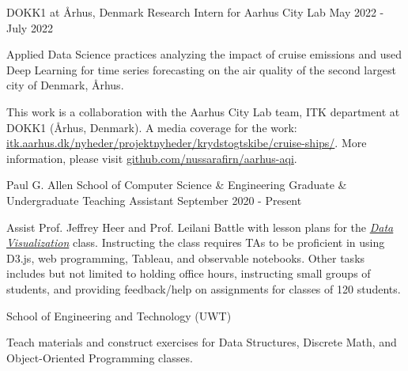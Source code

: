 \begin{cventries}
  \cventry
    {DOKK1 at Århus, Denmark} %
    {Research Intern for Aarhus City Lab} %
    {May 2022 - July 2022} %
    {} %
    {
      \begin{cvitems} %
        \item {
          Applied Data Science practices analyzing the impact of cruise emissions and used Deep Learning for time series forecasting on the air quality of the second largest city of Denmark, Århus.
        }
        \item {
          This work is a collaboration with the Aarhus City Lab team, ITK department at DOKK1 (Århus, Denmark). A media coverage for the work: \href{https://itk.aarhus.dk/nyheder/projektnyheder/krydstogtskibe/cruise-ships/}{itk.aarhus.dk/nyheder/projektnyheder/krydstogtskibe/cruise-ships/}. More information, please visit \href{https://github.com/nussarafirn/aarhus-aqi}{github.com/nussarafirn/aarhus-aqi}. 
        }
      \end{cvitems}
    }
  \cventry
    {Paul G. Allen School of Computer Science \& Engineering} %
    {Graduate  \& Undergraduate Teaching Assistant} %
    {September 2020 - Present} %
    {} %
    {
      \begin{cvitems} %
        \item {
           Assist Prof. Jeffrey Heer and  Prof. Leilani Battle with lesson plans for the \textit{\href{https://courses.cs.washington.edu/courses/cse442/22au/}{Data Visualization}} class. Instructing the class requires TAs to be proficient in using D3.js, web programming, Tableau, and observable notebooks.  Other tasks includes but not limited to holding office hours, instructing small groups of students, and providing feedback/help on assignments for classes of 120 students.
        }
      \end{cvitems}
    }
    \cventry
    {School of Engineering and Technology (UWT)} %
    {} %
    {} %
    {} 
    {
      \begin{cvitems} %
        \item {
            Teach materials and construct exercises for Data Structures, Discrete Math, and Object-Oriented Programming classes.
        }

\end{cvitems}}
\end{cventries}
